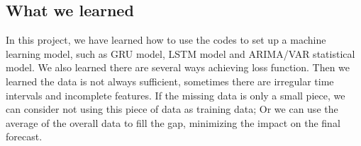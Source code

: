 \documentclass[conference]{IEEEtran}
\begin{document}
\subsection{What we learned}

In this project, we have learned how to use the codes to set up a machine learning model, such as  GRU model, LSTM model and ARIMA/VAR statistical model. We also learned there are several ways achieving loss function. Then we learned the data is not always sufficient, sometimes there are irregular time intervals and incomplete features. If the missing data is only a small piece, we can consider not using this piece of data as training data; Or we can use the average of the overall data to fill the gap, minimizing the impact on the final forecast. 


\end{document}
